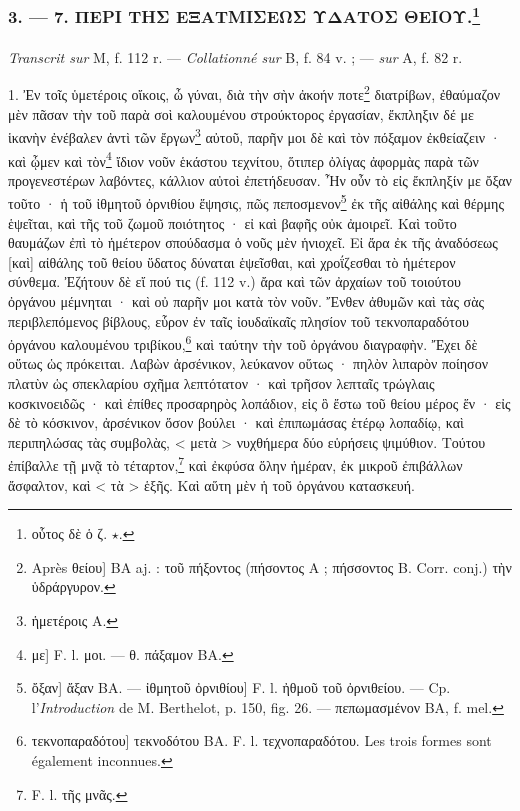 \documentclass[a4paper, 11pt, oneside, polutonikogreek, french]{article}
\begin{document}
\subsubsection[3. --- 7. ΠΕΡΙ ΤΗΣ ΕΞΑΤΜΙΣΕΩΣ ΥΔΑΤΟΣ ΘΕΙΟΥ.]{3. --- 7. ΠΕΡΙ ΤΗΣ ΕΞΑΤΜΙΣΕΩΣ ΥΔΑΤΟΣ ΘΕΙΟΥ.\footnote{οὗτος δὲ ὁ ζ. $\star$.}}
\paragraph{}
\emph{Transcrit sur} M, f. 112 r. --- \emph{Collationné sur} B, f. 84 v. ; --- \emph{sur} A, f. 82 r.

\bigskip

1. Ἐν τοῖς ὑμετέροις οἴκοις, ὦ γύναι, διὰ τὴν σὴν ἀκοήν ποτε\footnote{Après θείου] BA aj. : τοῦ πήξοντος (πήσοντος A ; πήσσοντος B. Corr. conj.) τὴν ὑδράργυρον.} διατρίβων, ἐθαύμαζον μὲν πᾶσαν τὴν τοῦ παρὰ σοὶ καλουμένου στρούκτορος ἐργασίαν, ἔκπληξιν δέ με ἱκανὴν ἐνέβαλεν ἀντὶ τῶν ἔργων\footnote{ἡμετέροις A.} αὐτοῦ, παρῆν μοι δὲ καὶ τὸν πόξαμον ἐκθείαζειν · καὶ ᾦμεν καὶ τὸν\footnote{με] F. l. μοι. --- θ. πάξαμον BA.} ἴδιον νοῦν ἑκάστου τεχνίτου, ὅτιπερ ὀλίγας ἀφορμὰς παρὰ τῶν προγενεστέρων λαβόντες, κάλλιον αὐτοὶ ἐπετήδευσαν. Ἦν οὖν τὸ εἰς ἔκπληξίν με ὄξαν τοῦτο · ἡ τοῦ ἰθμητοῦ ὀρνιθίου ἕψησις, πῶς πεποσμενον\footnote{ὄξαν] ἄξαν BA. --- ἰθμητοῦ ὀρνιθίου] F. l. ἠθμοῦ τοῦ ὀρνιθείου. --- Cp. l'\emph{Introduction} de M. Berthelot, p. 150, fig. 26. --- πεπωμασμένον BA, f. mel.} ἐκ τῆς αἰθάλης καὶ θέρμης ἑψεῖται, καὶ τῆς τοῦ ζωμοῦ ποιότητος · εἰ καὶ βαφῆς οὐκ ἀμοιρεῖ. Καὶ τοῦτο θαυμάζων ἐπὶ τὸ ἡμέτερον σπούδασμα ὁ νοῦς μὲν ἡνιοχεῖ. Εἰ ἄρα ἐκ τῆς ἀναδόσεως [καὶ] αἰθάλης τοῦ θείου ὕδατος δύναται ἑψεῖσθαι, καὶ χροΐζεσθαι τὸ ἡμέτερον σύνθεμα. Ἐζήτουν δὲ εἴ πού τις (f. 112 v.) ἄρα καὶ τῶν ἀρχαίων τοῦ τοιούτου ὀργάνου μέμνηται · καὶ οὐ παρῆν μοι κατὰ τὸν νοῦν. Ἔνθεν ἀθυμῶν καὶ τὰς σὰς περιβλεπόμενος βίβλους, εὗρον ἐν ταῖς ἰουδαϊκαῖς πλησίον τοῦ τεκνοπαραδότου ὀργάνου καλουμένου τριβίκου,\footnote{τεκνοπαραδότου] τεκνοδότου BA. F. l. τεχνοπαραδότου. Les trois formes sont également inconnues.} καὶ ταύτην τὴν τοῦ ὀργάνου διαγραφὴν. Ἔχει δὲ οὕτως ὡς πρόκειται. Λαβὼν ἀρσένικον, λεύκανον οὕτως · πηλὸν λιπαρὸν ποίησον πλατὺν ὡς σπεκλαρίου σχῆμα λεπτότατον · καὶ τρῆσον λεπταῖς τρώγλαις κοσκινοειδῶς · καὶ ἐπίθες προσαρηρὸς λοπάδιον, εἰς ὃ ἔστω τοῦ θείου μέρος ἕν · εἰς δὲ τὸ κόσκινον, ἀρσένικον ὅσον βούλει · καὶ ἐπιπωμάσας ἑτέρῳ λοπαδίῳ, καὶ περιπηλώσας τὰς συμβολὰς, < μετὰ > νυχθήμερα δύο εὑρήσεις ψιμύθιον. Τούτου ἐπίβαλλε τῇ μνᾷ τὸ τέταρτον,\footnote{F. l. τῆς μνᾶς.} καὶ ἐκφύσα ὅλην ἡμέραν, ἐκ μικροῦ ἐπιβάλλων ἄσφαλτον, καὶ < τὰ > ἑξῆς. Καὶ αὕτη μὲν ἡ τοῦ ὁργάνου κατασκευή.
\end{document}
